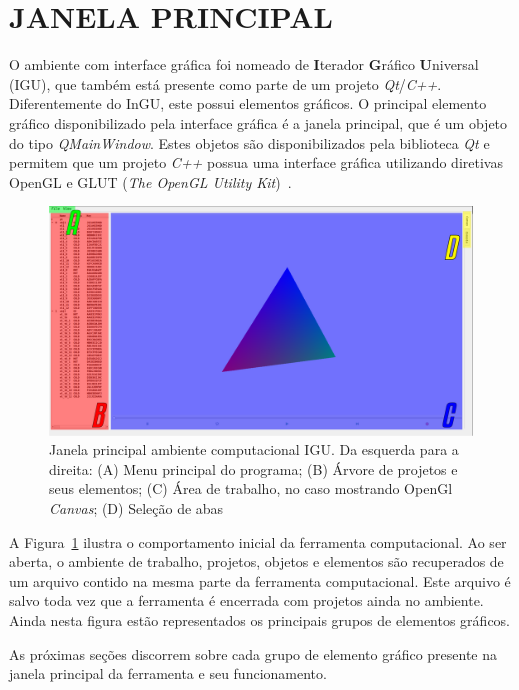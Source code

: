 \section{JANELA PRINCIPAL}\label{sec:janela}

O ambiente com interface gráfica foi nomeado de \textbf{I}terador \textbf{G}ráfico \textbf{U}niversal (IGU), que também está presente como parte de um projeto \textit{Qt}/\textit{C++}. Diferentemente do InGU, este possui elementos gráficos. O principal elemento gráfico disponibilizado pela interface gráfica é a janela principal, que é um objeto do tipo \textit{QMainWindow}. Estes objetos são disponibilizados pela biblioteca \textit{Qt} e permitem que um projeto \textit{C++} possua uma interface gráfica utilizando diretivas OpenGL e GLUT (\textit{The OpenGL Utility Kit})~\cite{OpenGL}.

\begin{figure}[!htbp]
	\centering
	\includegraphics[width=\linewidth]{Figures/IGU_001a.png}
	\caption{Janela principal ambiente computacional IGU. Da esquerda para a direita: (A) Menu principal do programa; (B) Árvore de projetos e seus elementos; (C) Área de trabalho, no caso mostrando OpenGl \textit{Canvas}; (D) Seleção de abas}
	\label{fig:UI}
\end{figure}

A Figura~\ref{fig:UI} ilustra o comportamento inicial da ferramenta computacional. Ao ser aberta, o ambiente de trabalho, projetos, objetos e elementos são recuperados de um arquivo contido na mesma parte da ferramenta computacional. Este arquivo é salvo toda vez que a ferramenta é encerrada com projetos ainda no ambiente. Ainda nesta figura estão representados os principais grupos de elementos gráficos.

As próximas seções discorrem sobre cada grupo de elemento gráfico presente na janela principal da ferramenta e seu funcionamento.

